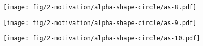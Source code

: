 \begin{frame}
\begin{columns}[t]
\begin{column}{6cm}
{\begin{figure}[h!]
        \end{figure}
      }
      {
        \begin{figure}[h!]
          \centering
          \texttt{[image: fig/2-motivation/alpha-shape-circle/as-8.pdf]}
        \end{figure}
      }
      {
        \begin{figure}[h!]
          \centering
          \texttt{[image: fig/2-motivation/alpha-shape-circle/as-9.pdf]}
        \end{figure}
      }
      {
        \begin{figure}[h!]
          \centering
          \texttt{[image: fig/2-motivation/alpha-shape-circle/as-10.pdf]}
        \end{figure}
      }

    \end{column}
  \end{columns}
\end{frame}


